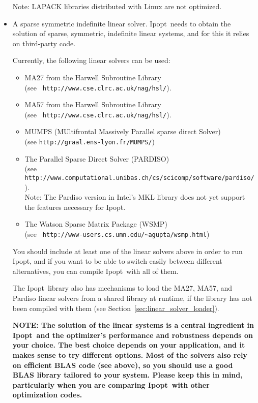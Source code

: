 \documentclass[10pt]{article}
\newcommand{\Ipopt}{{\sc Ipopt}}
\begin{document}
\begin{itemize}
  Note: LAPACK libraries distributed with Linux are not optimized.
\item A sparse symmetric indefinite linear solver. \Ipopt\ needs
  to obtain the solution of sparse, symmetric, indefinite linear
  systems, and for this it relies on third-party code.  

  Currently, the following linear solvers can be used:
  \begin{itemize}
  \item MA27 from the Harwell Subroutine Library\\ (see {\tt
      http://www.cse.clrc.ac.uk/nag/hsl/}).
  \item MA57 from the Harwell Subroutine Library\\ (see {\tt
      http://www.cse.clrc.ac.uk/nag/hsl/}).
  \item MUMPS (MUltifrontal Massively Parallel sparse direct Solver)\\
    (see {\tt http://graal.ens-lyon.fr/MUMPS/})
  \item The Parallel Sparse Direct Solver (PARDISO)\\ (see {\tt
      http://www.computational.unibas.ch/cs/scicomp/software/pardiso/}).\\
    Note: The Pardiso version in Intel's MKL library does not yet
    support the features necessary for \Ipopt.
  \item The Watson Sparse Matrix Package (WSMP)\\ (see {\tt
       http://www-users.cs.umn.edu/\verb|~|agupta/wsmp.html})
  \end{itemize}
  You should include at least one of the linear solvers above in order
  to run \Ipopt, and if you want to be able to switch easily between
  different alternatives, you can compile \Ipopt\ with all of them.

  The \Ipopt\ library also has mechanisms to load the MA27, MA57, and
  Pardiso linear solvers from a shared library at runtime, if the
  library has not been compiled with them (see
  Section~\ref{sec:linear_solver_loader}).

  \textbf{NOTE: The solution of the linear systems is a central
    ingredient in \Ipopt\ and the optimizer's performance and
    robustness depends on your choice.  The best choice depends on
    your application, and it makes sense to try different options.
    Most of the solvers also rely on efficient BLAS code (see above),
    so you should use a good BLAS library tailored to your system.
    Please keep this in mind, particularly when you are comparing
    \Ipopt\ with other optimization codes.}


\end{itemize}
\end{document}
